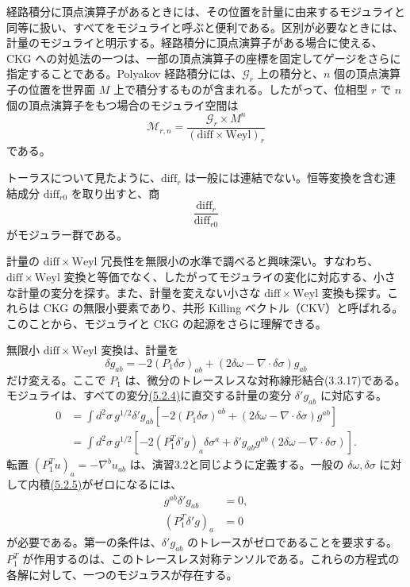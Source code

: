 経路積分に頂点演算子があるときには、その位置を計量に由来するモジュライと同等に扱い、すべてをモジュライと呼ぶと便利である。区別が必要なときには、計量のモジュライと明示する。経路積分に頂点演算子がある場合に使える、CKG への対処法の一つは、一部の頂点演算子の座標を固定してゲージをさらに指定することである。Polyakov 経路積分には、$\mathcal G_r$ 上の積分と、$n$ 個の頂点演算子の位置を世界面 $M$ 上で積分するものが含まれる。したがって、位相型 $r$ で $n$ 個の頂点演算子をもつ場合のモジュライ空間は
\begin{equation}
\mathcal M_{r,n}
=\frac{\mathcal G_r\times M^n}{(\mathrm{diff}\times\mathrm{Weyl})_r}
\tag{5.2.2}\label{eq:5.2.2}
\end{equation}
である。

トーラスについて見たように、$\mathrm{diff}_r$ は一般には連結でない。恒等変換を含む連結成分 $\mathrm{diff}_{r0}$ を取り出すと、商
\begin{equation}
\frac{\mathrm{diff}_r}{\mathrm{diff}_{r0}}
\tag{5.2.3}\label{eq:5.2.3}
\end{equation}
がモジュラー群である。

計量の $\mathrm{diff}\times\mathrm{Weyl}$ 冗長性を無限小の水準で調べると興味深い。すなわち、$\mathrm{diff}\times\mathrm{Weyl}$ 変換と等価でなく、したがってモジュライの変化に対応する、小さな計量の変分を探す。また、計量を変えない小さな $\mathrm{diff}\times\mathrm{Weyl}$ 変換も探す。これらは CKG の無限小要素であり、共形 Killing ベクトル（CKV）と呼ばれる。このことから、モジュライと CKG の起源をさらに理解できる。

無限小 $\mathrm{diff}\times\mathrm{Weyl}$ 変換は、計量を
\begin{equation}
\delta g_{ab}=-2(P_1\delta\sigma)_{ab}
+(2\delta\omega-\nabla\cdot\delta\sigma)g_{ab}
\tag{5.2.4}\label{eq:5.2.4}
\end{equation}
だけ変える。ここで $P_1$ は、微分のトレースレスな対称線形結合(3.3.17)である。モジュライは、すべての変分\hyperref[eq:5.2.4]{(5.2.4)}に直交する計量の変分 $\delta'g_{ab}$ に対応する。
\begin{equation}
\begin{aligned}
0&=\int d^2\sigma\,g^{1/2}\delta'g_{ab}
\left[-2(P_1\delta\sigma)^{ab}
+(2\delta\omega-\nabla\cdot\delta\sigma)g^{ab}\right]\\
&=\int d^2\sigma\,g^{1/2}
\left[-2(P_1^T\delta'g)_a\delta\sigma^a
+\delta'g_{ab}g^{ab}(2\delta\omega-\nabla\cdot\delta\sigma)\right].
\end{aligned}
\tag{5.2.5}\label{eq:5.2.5}
\end{equation}
転置 $(P_1^Tu)_a=-\nabla^bu_{ab}$ は、演習3.2と同じように定義する。一般の $\delta\omega,\delta\sigma$ に対して内積\hyperref[eq:5.2.5]{(5.2.5)}がゼロになるには、
\begin{align}
g^{ab}\delta'g_{ab}&=0,
\tag{5.2.6a}\label{eq:5.2.6a}\\
(P_1^T\delta'g)_a&=0
\tag{5.2.6b}\label{eq:5.2.6b}
\end{align}
が必要である。第一の条件は、$\delta'g_{ab}$ のトレースがゼロであることを要求する。$P_1^T$ が作用するのは、このトレースレス対称テンソルである。これらの方程式の各解に対して、一つのモジュラスが存在する。

